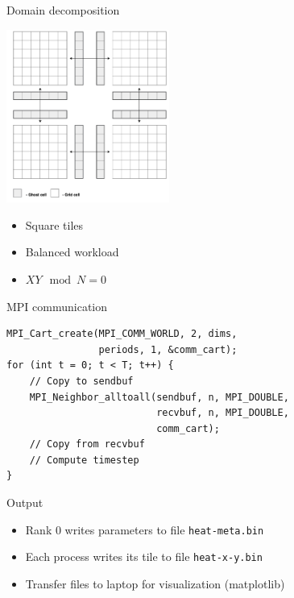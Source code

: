 \documentclass{beamer}
\begin{document}
\begin{frame}{Domain decomposition}
    \begin{center}
        \includegraphics[width=0.4\textwidth]{grid.png}
    \end{center}

    \begin{itemize}
        \item Square tiles
        \item Balanced workload
        \item $XY \mod N = 0$
    \end{itemize}
\end{frame}

\begin{frame}[fragile]{MPI communication}
    \begin{lstlisting}
MPI_Cart_create(MPI_COMM_WORLD, 2, dims,
                periods, 1, &comm_cart);
for (int t = 0; t < T; t++) {
    // Copy to sendbuf
    MPI_Neighbor_alltoall(sendbuf, n, MPI_DOUBLE,
                          recvbuf, n, MPI_DOUBLE,
                          comm_cart);
    // Copy from recvbuf
    // Compute timestep
}
    \end{lstlisting}
\end{frame}

\begin{frame}[fragile]{Output}
    \begin{itemize}
        \item Rank 0 writes parameters to file \verb|heat-meta.bin|
        \item Each process writes its tile to file \verb|heat-x-y.bin|
        \item Transfer files to laptop for visualization (matplotlib)
    \end{itemize}
\end{frame}
\end{document}
